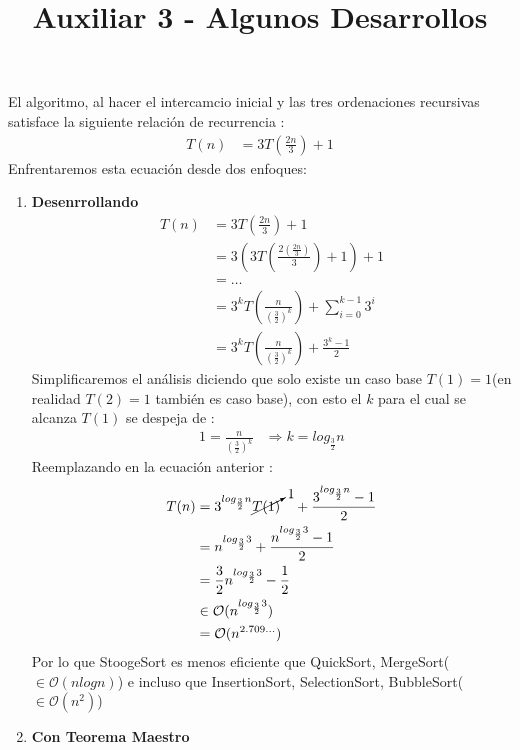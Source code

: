 \documentclass[dcc]{fcfmcourse}
\title{Auxiliar 3 - Algunos Desarrollos}
\begin{document}
\maketitle

\vspace{-1ex}

\begin{problems}
\problem El algoritmo, al hacer el intercamcio inicial y las tres ordenaciones recursivas satisface la siguiente relación de recurrencia :
\begin{align*}
T(n) &= 3T\left(\frac{2n}{3}\right) + 1
\end{align*}
Enfrentaremos esta ecuación desde dos enfoques:
\begin{enumerate}
\item \textbf{Desenrrollando} 
\begin{align*}
T(n) &= 3T\left(\frac{2n}{3}\right) + 1\\
&= 3\left(3T\left(\frac{2\left(\frac{2n}{3}\right)}{3}\right) + 1\right) + 1\\
&= \ldots \\
&= 3^{k} T\left(\frac{n}{\left(\frac{3}{2}\right)^{k}}\right) + \sum_{i=0}^{k-1} 3^i\\
&= 3^{k} T\left(\frac{n}{\left(\frac{3}{2}\right)^{k}}\right) + \frac{3^k-1}{2}
\end{align*}
Simplificaremos el análisis diciendo que solo existe un caso base $T(1) = 1$(en realidad $T(2) = 1$ también es caso base), con esto el $k$ para el cual se alcanza $T(1)$ se despeja de :
\begin{align*}
1 = \frac{n}{\left(\frac{3}{2}\right)^{k}} & \Rightarrow  k = log_{\frac{3}{2}} n
\end{align*}
Reemplazando en la ecuación anterior :
\begin{align*}
T(n) &= 3^{log_{\frac{3}{2}} n} \cancelto{1}{T(1)}\quad + \frac{3^{log_{\frac{3}{2}} n}-1}{2}\\
&= n^{log_{\frac{3}{2}} 3}  + \frac{n^{log_{\frac{3}{2}} 3} - 1}{2}\\
&= \frac{3}{2} n^{log_{\frac{3}{2}} 3} - \frac{1}{2}\\
&\in \mathcal{O}( n^{log_{\frac{3}{2}} 3})\\
&= \mathcal{O}( n^{2.709\ldots})
\end{align*}
Por lo que StoogeSort es menos eficiente que QuickSort, MergeSort($\in \mathcal{O}(nlog n)$) e incluso que InsertionSort, SelectionSort, BubbleSort($\in \mathcal{O}(n^2)$)
\item \textbf{Con Teorema Maestro}\\

\end{enumerate}
\end{problems}
\end{document}
